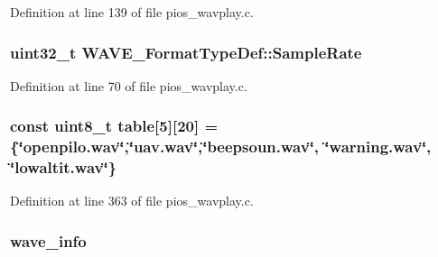 \-Definition at line 139 of file pios\-\_\-wavplay.\-c.

\hypertarget{group___w_a_v_e_p_l_a_y_e_r___private___variables_ga4f574183b180c6eee94ec82826583941}{
\subsubsection[{\-Sample\-Rate}]{\setlength{\rightskip}{0pt plus 5cm}uint32\-\_\-t {\bf \-W\-A\-V\-E\-\_\-\-Format\-Type\-Def\-::\-Sample\-Rate}}}\label{group___w_a_v_e_p_l_a_y_e_r___private___variables_ga4f574183b180c6eee94ec82826583941}


\-Definition at line 70 of file pios\-\_\-wavplay.\-c.

\hypertarget{group___w_a_v_e_p_l_a_y_e_r___private___variables_gacad7ec90c8f694c87a4695350cb98d5d}{
\subsubsection[{table}]{\setlength{\rightskip}{0pt plus 5cm}const uint8\-\_\-t {\bf table}\mbox{[}5\mbox{]}\mbox{[}20\mbox{]} = \{\char`\"{}openpilo.\-wav\char`\"{},\char`\"{}uav.\-wav\char`\"{},\char`\"{}beepsoun.\-wav\char`\"{}, \char`\"{}warning.\-wav\char`\"{}, \char`\"{}lowaltit.\-wav\char`\"{}\}}}\label{group___w_a_v_e_p_l_a_y_e_r___private___variables_gacad7ec90c8f694c87a4695350cb98d5d}


\-Definition at line 363 of file pios\-\_\-wavplay.\-c.

\hypertarget{group___w_a_v_e_p_l_a_y_e_r___private___variables_ga174829d299c4713257749f20bfc996f4}{
\subsubsection[{wave\-\_\-info}]{ {\bf wave\-\_\-info}}}\label{group___w_a_v_e_p_l_a_y_e_r___private___variables_ga174829d299c4713257749f20bfc996f4}


